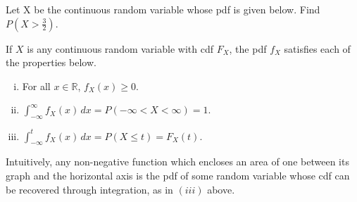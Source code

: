 \begin{examp} Let X be the continuous random variable whose pdf is given below. Find $P(X > \frac{3}{2})$.
\vspace{-0.5em}
\begin{center}
    \begin{minipage}{.5\textwidth}
        \centering
        \renewcommand*{\arraystretch}{1.35}
\vspace{1.25em}
\renewcommand*{\arraystretch}{1}
    \end{minipage}%
    \begin{minipage}{0.5\textwidth}
        \centering
\end{minipage}
\end{center}
\vspace{-0.5em}

\end{examp}
\par
\begin{prop}If $X$ is any continuous random variable with cdf $F_X$, the pdf $f_X$ satisfies each of the properties below.
\vspace{-0.5em}
\begin{enumerate}[(i)]
\item For all $x \in \mathbb{R}$, $f_X(x) \geq 0$.
\item $\int_{-\infty}^{\infty} f_X(x) \, dx = P(-\infty < X < \infty) = 1$.
\item $\int_{-\infty}^{t} f_X(x) \, dx = P(X \leq t) = F_X(t)$.
\end{enumerate}
\end{prop}
\par
Intuitively, any non-negative function which encloses an area of one between its graph and the horizontal axis is the pdf of some random variable whose cdf can be recovered through integration, as in $(iii)$ above.


